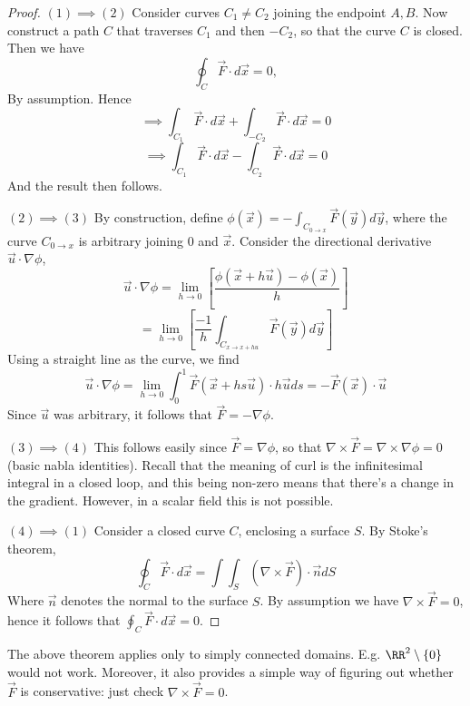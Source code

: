 \begin{proof}
  \emph{$(1)\implies (2)$} Consider curves $C_1\neq C_2$  joining the endpoint
  $A,B$. Now construct a path $C$ that traverses $C_1$ and then $-C_2$, so that
  the curve $C$ is closed. Then we have 
  \[\oint_C \vec{F}\cdot d\vec{x} =0,\]
  By assumption. Hence
  \[\implies \int_{C_1}\vec{F}\cdot d\vec{x} + \int_{-C_2}\vec{F}\cdot d\vec{x}
  =0\]
  \[\implies \int_{C_1}\vec{F}\cdot d\vec{x} - \int_{C_2}\vec{F}\cdot d\vec{x}
  =0 \]
  And the result then follows.
  
  \emph{$(2)\implies (3)$} By construction, define
  $\phi(\vec{x})=-\int_{C_{0\to x}} \vec{F}(\vec{y}) d\vec{y}$, where the curve
  $C_{0\to x}$ is arbitrary joining $0$ and $\vec{x}$. Consider the directional
  derivative $\vec{u}\cdot\nabla \phi$,
  \[\vec{u}\cdot\nabla \phi= \lim_{h\to 0}\left[ \frac{\phi(\vec{x}+h\vec{u}) -
  \phi(\vec{x})}{h} \right]\]
  \[= \lim_{h\to 0} \left[ \frac{-1}{h}\int_{C_{x\to x+hu}}\vec{F}(\vec{y})
  d\vec{y} \right]\]
  Using a straight line as the curve, we find
  \[\vec{u}\cdot\nabla \phi = \lim_{h\to
  0}\int_0^1\vec{F}(\vec{x}+hs\vec{u})\cdot h\vec{u}
  ds=-\vec{F}(\vec{x})\cdot\vec{u}\]
  Since $\vec{u}$ was arbitrary, it follows that $\vec{F}=-\nabla\phi$.

  \emph{$(3)\implies (4)$} This follows easily since $\vec{F}=\nabla \phi$, so
  that $\nabla \times \vec{F} = \nabla \times \nabla \phi =0$ (basic nabla
  identities). Recall that the meaning of curl is the infinitesimal integral in
  a closed loop, and this being non-zero means that there's a change in the
  gradient. However, in a scalar field this is not possible.

  \emph{$(4)\implies (1)$} Consider a closed curve $C$, enclosing a surface $S$.
  By Stoke's theorem,
  \[\oint_C \vec{F}\cdot d\vec{x} = \int\int_S (\nabla \times \vec{F})\cdot
  \vec{n} dS\]
  Where $\vec{n}$ denotes the normal to the surface $S$. By assumption we have
  $\nabla \times \vec{F}=0$, hence it follows that $\oint_C\vec{F}\cdot
  d\vec{x}=0$.
\end{proof}
\begin{remark}
  The above theorem applies only to simply connected domains. E.g.
  $\RR^2\setminus \{0\}$ would not work. Moreover, it also provides a simple way
  of figuring out whether $\vec{F}$ is conservative: just check $\nabla\times
  \vec{F}=0$.
\end{remark}

